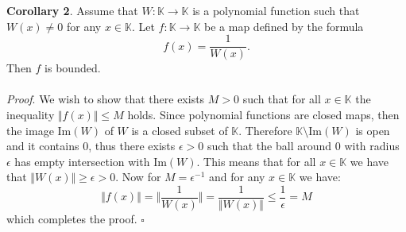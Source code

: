 \documentclass[12pt]{article}
\begin{document}
\textbf{Corollary 2}. Assume that $W:\mathbb{K}\to\mathbb{K}$ is a polynomial function such that $W(x)\neq 0$ for any $x\in\mathbb{K}$. Let $f:\mathbb{K}\to\mathbb{K}$ be a map defined by the formula
$$f(x)=\frac{1}{W(x)}.$$
Then $f$ is bounded.\\ \\
\textit{Proof}. We wish to show that there exists $M>0$ such that for all $x\in\mathbb{K}$ the inequality $\Vert f(x)\Vert \leq M$ holds. Since polynomial functions are closed maps, then the image $\mathrm{Im}(W)$ of $W$ is a closed subset of $\mathbb{K}$. Therefore $\mathbb{K}\setminus\mathrm{Im}(W)$ is open and it contains $0$, thus there exists $\epsilon >0$ such that the ball around $0$ with radius $\epsilon$ has empty intersection with $\mathrm{Im}(W)$. This means that for all $x\in\mathbb{K}$ we have that $\Vert W(x)\Vert\geq\epsilon>0$. Now for $M=\epsilon^{-1}$ and for any $x\in\mathbb{K}$ we have:
$$\Vert f(x)\Vert = \bigg\Vert\frac{1}{W(x)}\bigg\Vert=\frac{1}{\Vert W(x)\Vert}\leq \frac{1}{\epsilon}=M$$
which completes the proof. $\square$
\end{document}
